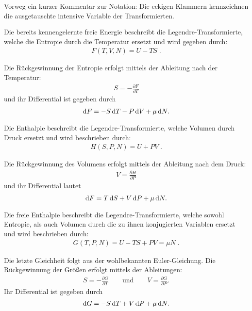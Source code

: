Vorweg ein kurzer Kommentar zur Notation: Die eckigen Klammern kennzeichnen die ausgetauschte intensive Variable der Transformierten. 
\begin{formal}

    Die bereits kennengelernte freie Energie beschreibt die Legendre-Transformierte, welche die Entropie durch die Temperatur ersetzt und wird gegeben durch:
    \begin{align*}
        \boxed{F(T,V,N)=U-TS}\;.
    \end{align*}
\end{formal}
Die Rückgewinnung der Entropie erfolgt mittels der Ableitung nach der Temperatur:
    \begin{align*}
        S=-\frac{\partial F}{\partial T}
    \end{align*}
    und ihr Differential ist gegeben durch 
    \begin{align*}
        \mathop{}\!\mathrm{d} F=-S\mathop{}\!\mathrm{d} T-P\mathop{}\!\mathrm{d} V+\mu \mathop{}\!\mathrm{d} N.
    \end{align*}
\begin{formal}

    Die Enthalpie beschreibt die Legendre-Transformierte, welche Volumen durch Druck ersetzt und wird beschrieben durch:
    \begin{align*}
        \boxed{H(S,P,N)=U+PV}\;.
    \end{align*}
\end{formal}
Die Rückgewinnung des Volumens erfolgt mittels der Ableitung nach dem Druck:
    \begin{align*}
        V=\frac{\partial H}{\partial P}
    \end{align*}
    und ihr Differential lautet
    \begin{align*}
        \mathop{}\!\mathrm{d} F=T\mathop{}\!\mathrm{d} S+V\mathop{}\!\mathrm{d} P+\mu \mathop{}\!\mathrm{d} N.
    \end{align*}
\begin{formal}

    Die freie Enthalpie beschreibt die Legendre-Transformierte, welche sowohl Entropie, als auch Volumen durch die zu ihnen konjugierten Variablen ersetzt und wird beschrieben durch:
    \begin{align*}
        \boxed{G(T,P,N)=U-TS+PV=\mu N}\;.
    \end{align*}
\end{formal}
Die letzte Gleichheit folgt aus der wohlbekannten Euler-Gleichung. Die Rückgewinnung der Größen erfolgt mittels der Ableitungen:
    \begin{align*}
        S=-\frac{\partial G}{\partial T}\qquad \mathrm{und}\qquad V=\frac{\partial G}{\partial P}.
    \end{align*}
    Ihr Differential ist gegeben durch 
    \begin{align*}
        \mathop{}\!\mathrm{d} G=-S\mathop{}\!\mathrm{d} T+V\mathop{}\!\mathrm{d} P+\mu \mathop{}\!\mathrm{d} N.
    \end{align*}

